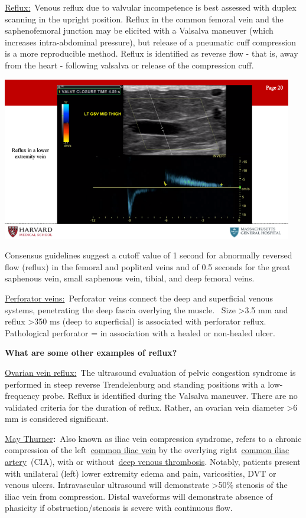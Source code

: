 \documentclass[
]{book}
\begin{document}
\underline{Reflux:}~Venous reflux due to valvular incompetence is best
assessed with duplex scanning in the upright position. Reflux in the
common femoral vein and the saphenofemoral junction may be elicited with
a Valsalva maneuver (which increases intra-abdominal pressure), but
release of a pneumatic cuff compression is a more reproducible method.
Reflux is identified as reverse flow - that is, away from the heart -
following valsalva or release of the compression cuff.

\includegraphics[width=5in]{images/vasc_lab/Slide21}

Consensus guidelines suggest a cutoff value of 1 second for abnormally
reversed flow (reflux) in the femoral and popliteal veins and of 0.5
seconds for the great saphenous vein, small saphenous vein, tibial, and
deep femoral veins.

\underline{Perforator veins:}~Perforator veins connect the deep and
superficial venous systems, penetrating the deep fascia overlying the
muscle.~ Size \textgreater3.5 mm and reflux \textgreater350 ms (deep to superficial) is
associated with perforator reflux. Pathological perforator = in
association with a healed or non-healed ulcer.

\textbf{What are some other examples of reflux?}

\underline{Ovarian vein reflux:}~The ultrasound evaluation of pelvic
congestion syndrome is performed in steep reverse Trendelenburg and
standing positions with a low-frequency probe. Reflux is identified
during the Valsalva maneuver. There are no validated criteria for the
duration of reflux. Rather, an ovarian vein diameter \textgreater6 mm is
considered significant.

\underline{May Thurner}\textbf{:}~Also known as iliac vein compression syndrome,
refers to a chronic compression of the left~\href{https://radiopaedia.org/articles/common-iliac-vein?lang=us}{common iliac
vein} by the
overlying right~\href{https://radiopaedia.org/articles/common-iliac-artery?lang=us}{common iliac
artery}~(CIA),
with or without~\href{https://radiopaedia.org/articles/deep-vein-thrombosis?lang=us}{deep venous
thrombosis}.
Notably, patients present with unilateral (left) lower extremity edema
and pain, varicosities, DVT or venous ulcers. Intravascular ultrasound
will demonstrate \textgreater50\% stenosis of the iliac vein from compression.
Distal waveforms will demonstrate absence of phasicity if
obstruction/stenosis is severe with continuous flow.
\end{document}
